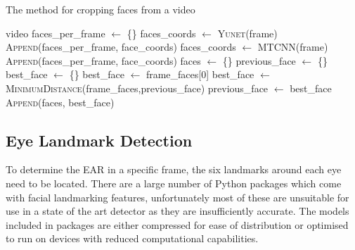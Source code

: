 \begin{algorithm}[h]
    \caption{The method for cropping faces from a video}
    \label{alg:face-detection}
    \begin{algorithmic}
        \Require video
        \State faces\_per\_frame $\gets$ \{\}
            \State faces\_coords $\gets$ \textsc{Yunet}(frame)
                \State \textsc{Append}(faces\_per\_frame, face\_coords)
            \Else
                \State faces\_coords $\gets$ \textsc{MTCNN}(frame)
                \State \textsc{Append}(faces\_per\_frame, face\_coords) 
            \EndIf
        \EndFor
        \State faces $\gets$ \{\}
        \State previous\_face $\gets$ \{\}
            \State best\_face $\gets$ \{\}
                \State best\_face $\gets$ frame\_faces[0]
            \Else
                \State best\_face $\gets$ \textsc{MinimumDistance}(frame\_faces,previous\_face)
            \EndIf
            \State previous\_face $\gets$ best\_face
            \State \textsc{Append}(faces, best\_face)
        \EndFor
    \end{algorithmic}
\end{algorithm}

\subsection{Eye Landmark Detection}
\label{sec:eye-landmark}


To determine the EAR in a specific frame, the six landmarks around each eye need to be located. There are a large number of Python packages which come with facial landmarking features, unfortunately most of these are unsuitable for use in a state of the art detector as they are insufficiently accurate. The models included in packages are either compressed for ease of distribution or optimised to run on devices with reduced computational capabilities. 

